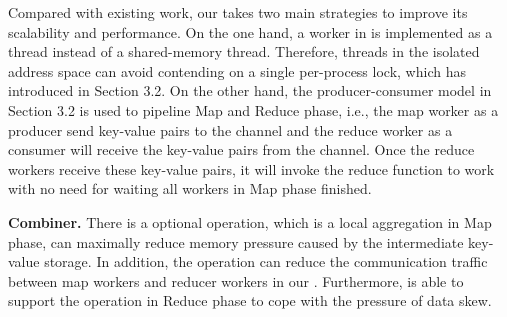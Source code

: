 Compared with existing work, our \myds takes two main strategies to improve its scalability and performance.
On the one hand, a worker in \myds is implemented as a \myth thread instead of a shared-memory thread.
Therefore, threads in the isolated address space can avoid contending on a single per-process lock, which has introduced in Section 3.2.
On the other hand, the producer-consumer model in Section 3.2 is used to pipeline Map and Reduce phase,
i.e., the map worker as a producer send key-value pairs to the channel and  the reduce worker as a consumer will receive the key-value pairs from the channel. 
Once the reduce workers receive these key-value pairs, it will invoke the reduce function to work with no need for waiting all workers in Map phase finished.


%
{\bf Combiner.}
There is a optional  operation, which is a local aggregation in Map phase, can maximally reduce memory pressure caused by the intermediate key-value storage.
In addition, the  operation can reduce the communication traffic  between map workers and reducer workers in our \myds.
Furthermore, \myds is able to support the  operation in Reduce phase to cope with the pressure of data skew. 

